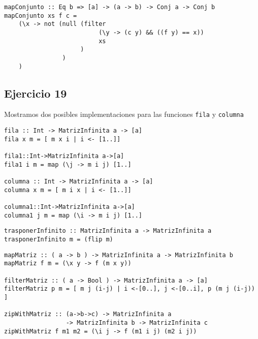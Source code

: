 \begin{centrado}
    \begin{verbatim}
mapConjunto :: Eq b => [a] -> (a -> b) -> Conj a -> Conj b
mapConjunto xs f c = 
    (\x -> not (null (filter 
                          (\y -> (c y) && ((f y) == x)) 
                          xs
                     )
                )
    )
    \end{verbatim}
\end{centrado}

\subsection{Ejercicio 19}
Mostramos dos posibles implementaciones para las funciones \texttt{fila} y \texttt{columna}
\begin{centrado}
    \begin{verbatim}
fila :: Int -> MatrizInfinita a -> [a]
fila x m = [ m x i | i <- [1..]]

fila1::Int->MatrizInfinita a->[a]
fila1 i m = map (\j -> m i j) [1..]

columna :: Int -> MatrizInfinita a -> [a]
columna x m = [ m i x | i <- [1..]]

columna1::Int->MatrizInfinita a->[a]
columna1 j m = map (\i -> m i j) [1..]
    \end{verbatim}
\end{centrado}

\begin{centrado}
    \begin{verbatim}
trasponerInfinito :: MatrizInfinita a -> MatrizInfinita a
trasponerInfinito m = (flip m)
    \end{verbatim}
\end{centrado}


\begin{centrado}
    \begin{verbatim}
mapMatriz :: ( a -> b ) -> MatrizInfinita a -> MatrizInfinita b
mapMatriz f m = (\x y -> f (m x y))

filterMatriz :: ( a -> Bool ) -> MatrizInfinita a -> [a]
filterMatriz p m = [ m j (i-j) | i <-[0..], j <-[0..i], p (m j (i-j)) ]

zipWithMatriz :: (a->b->c) -> MatrizInfinita a 
                 -> MatrizInfinita b -> MatrizInfinita c
zipWithMatriz f m1 m2 = (\i j -> f (m1 i j) (m2 i j))
    \end{verbatim}
\end{centrado}

